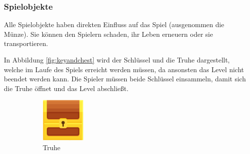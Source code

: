 \subsubsection{Spielobjekte}
\label{subsubsec:implementierung:umsetzung:realisierung:spielobjekte}
Alle Spielobjekte haben direkten Einfluss auf das Spiel (ausgenommen die Münze). Sie können den Spielern schaden, ihr Leben erneuern oder sie transportieren. 

In Abbildung \ref{fig:keyandchest} wird der Schlüssel und die Truhe dargestellt, welche im Laufe des Spiels erreicht werden müssen, da ansonsten das Level nicht beendet werden kann. Die Spieler müssen beide Schlüssel einsammeln, damit sich die Truhe öffnet und das Level abschließt.

\begin{figure}[H]
    \centering
    \begin{subfigure}[H]{0.15\textwidth}
        \includegraphics[width=\textwidth]{img/realisierung/assets/chest}
        \caption{Truhe}
        \label{fig:truhe}
    \end{subfigure}
    \qquad
    \begin{subfigure}[H]{0.15\textwidth}

\end{subfigure}
\end{figure}
